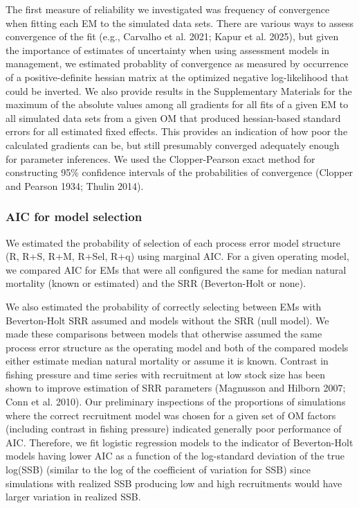 \documentclass[
  12pt,
]{article}
\begin{document}
The first measure of reliability we investigated was frequency of
convergence when fitting each EM to the simulated data sets. There are
various ways to assess convergence of the fit (e.g., Carvalho et al.
2021; Kapur et al. 2025), but given the importance of estimates of
uncertainty when using assessment models in management, we estimated
probablity of convergence as measured by occurrence of a
positive-definite hessian matrix at the optimized negative
log-likelihood that could be inverted. We also provide results in the
Supplementary Materials for the maximum of the absolute values among all
gradients for all fits of a given EM to all simulated data sets from a
given OM that produced hessian-based standard errors for all estimated
fixed effects. This provides an indication of how poor the calculated
gradients can be, but still presumably converged adequately enough for
parameter inferences. We used the Clopper-Pearson exact method for
constructing 95\% confidence intervals of the probabilities of
convergence (Clopper and Pearson 1934; Thulin 2014).

\subsubsection*{AIC for model selection}\label{aic-for-model-selection}

We estimated the probability of selection of each process error model
structure (R, R+S, R+M, R+Sel, R+q) using marginal AIC. For a given
operating model, we compared AIC for EMs that were all configured the
same for median natural mortality (known or estimated) and the SRR
(Beverton-Holt or none).

We also estimated the probability of correctly selecting between EMs
with Beverton-Holt SRR assumed and models without the SRR (null model).
We made these comparisons between models that otherwise assumed the same
process error structure as the operating model and both of the compared
models either estimate median natural mortality or assume it is known.
Contrast in fishing pressure and time series with recruitment at low
stock size has been shown to improve estimation of SRR parameters
(Magnusson and Hilborn 2007; Conn et al. 2010). Our preliminary
inspections of the proportions of simulations where the correct
recruitment model was chosen for a given set of OM factors (including
contrast in fishing pressure) indicated generally poor performance of
AIC. Therefore, we fit logistic regression models to the indicator of
Beverton-Holt models having lower AIC as a function of the log-standard
deviation of the true log(SSB) (similar to the log of the coefficient of
variation for SSB) since simulations with realized SSB producing low and
high recruitments would have larger variation in realized SSB.
\end{document}
